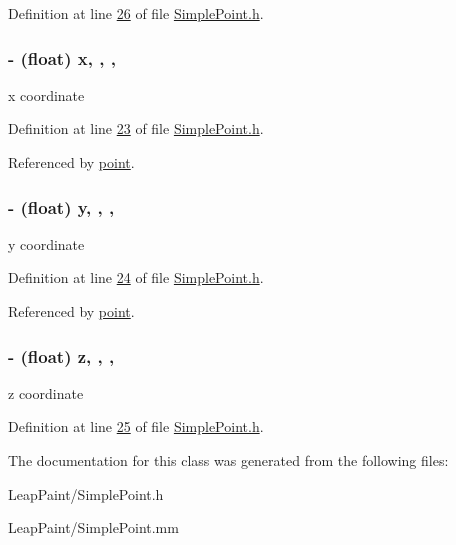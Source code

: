 Definition at line \hyperlink{_simple_point_8h_source_l00026}{26} of file \hyperlink{_simple_point_8h_source}{Simple\-Point.\-h}.

\hypertarget{interface_simple_point_abb16aaf6215e9e946606b30199b1c3af}{
\subsubsection[{x}]{\setlength{\rightskip}{0pt plus 5cm}-\/ (float) x\hspace{0.3cm}{\ttfamily [read]}, {\ttfamily [write]}, {\ttfamily [nonatomic]}, {\ttfamily [assign]}}}\label{d9/dc7/interface_simple_point_abb16aaf6215e9e946606b30199b1c3af}
x coordinate 

Definition at line \hyperlink{_simple_point_8h_source_l00023}{23} of file \hyperlink{_simple_point_8h_source}{Simple\-Point.\-h}.



Referenced by \hyperlink{_simple_point_8mm_source_l00074}{point}.

\hypertarget{interface_simple_point_ae10ba2c5156e6061258a0720443cd1c8}{
\subsubsection[{y}]{\setlength{\rightskip}{0pt plus 5cm}-\/ (float) y\hspace{0.3cm}{\ttfamily [read]}, {\ttfamily [write]}, {\ttfamily [nonatomic]}, {\ttfamily [assign]}}}\label{d9/dc7/interface_simple_point_ae10ba2c5156e6061258a0720443cd1c8}
y coordinate 

Definition at line \hyperlink{_simple_point_8h_source_l00024}{24} of file \hyperlink{_simple_point_8h_source}{Simple\-Point.\-h}.



Referenced by \hyperlink{_simple_point_8mm_source_l00074}{point}.

\hypertarget{interface_simple_point_ad74ae8e5d653579e791c040155e7d4d6}{
\subsubsection[{z}]{\setlength{\rightskip}{0pt plus 5cm}-\/ (float) z\hspace{0.3cm}{\ttfamily [read]}, {\ttfamily [write]}, {\ttfamily [nonatomic]}, {\ttfamily [assign]}}}\label{d9/dc7/interface_simple_point_ad74ae8e5d653579e791c040155e7d4d6}
z coordinate 

Definition at line \hyperlink{_simple_point_8h_source_l00025}{25} of file \hyperlink{_simple_point_8h_source}{Simple\-Point.\-h}.



The documentation for this class was generated from the following files\-:\begin{DoxyCompactItemize}
\item 
Leap\-Paint/Simple\-Point.\-h\item 
Leap\-Paint/Simple\-Point.\-mm\end{DoxyCompactItemize}
